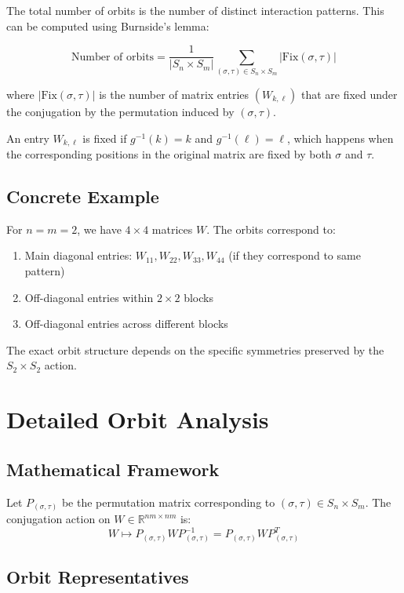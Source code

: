 \documentclass[11pt]{article}
\begin{document}
The total number of orbits is the number of distinct interaction patterns. This can be computed using Burnside's lemma:

\[
\text{Number of orbits} = \frac{1}{|S_n \times S_m|} \sum_{(\sigma,\tau) \in S_n \times S_m} |\text{Fix}(\sigma,\tau)|
\]

where $|\text{Fix}(\sigma,\tau)|$ is the number of matrix entries $(W_{k,\ell})$ that are fixed under the conjugation by the permutation induced by $(\sigma,\tau)$.

An entry $W_{k,\ell}$ is fixed if $g^{-1}(k) = k$ and $g^{-1}(\ell) = \ell$, which happens when the corresponding positions in the original matrix are fixed by both $\sigma$ and $\tau$.

\subsection{Concrete Example}

For $n = m = 2$, we have $4 \times 4$ matrices $W$. The orbits correspond to:
\begin{enumerate}
    \item Main diagonal entries: $W_{11}, W_{22}, W_{33}, W_{44}$ (if they correspond to same pattern)
    \item Off-diagonal entries within $2 \times 2$ blocks
    \item Off-diagonal entries across different blocks
\end{enumerate}

The exact orbit structure depends on the specific symmetries preserved by the $S_2 \times S_2$ action.

\section{Detailed Orbit Analysis}

\subsection{Mathematical Framework}

Let $P_{(\sigma,\tau)}$ be the permutation matrix corresponding to $(\sigma, \tau) \in S_n \times S_m$. The conjugation action on $W \in \mathbb{R}^{nm \times nm}$ is:
\[
W \mapsto P_{(\sigma,\tau)} W P_{(\sigma,\tau)}^{-1} = P_{(\sigma,\tau)} W P_{(\sigma,\tau)}^T
\]

\subsection{Orbit Representatives}
\end{document}
